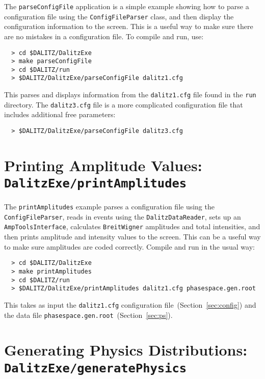 \documentclass[11pt]{article}
\begin{document}
The {\tt parseConfigFile} application is a simple example showing how to parse a configuration file using the {\tt ConfigFileParser} class, and then display the configuration information to the screen.  This is a useful way to make sure there are no mistakes in a configuration file.  To compile and run, use:
\begin{verbatim}
  > cd $DALITZ/DalitzExe
  > make parseConfigFile
  > cd $DALITZ/run
  > $DALITZ/DalitzExe/parseConfigFile dalitz1.cfg
\end{verbatim}
This parses and displays information from the {\tt dalitz1.cfg} file found in the {\tt run} directory.  The {\tt dalitz3.cfg} file is a more complicated configuration file that includes additional free parameters:
\begin{verbatim}
  > $DALITZ/DalitzExe/parseConfigFile dalitz3.cfg
\end{verbatim}

\section{Printing Amplitude Values: \\
{\tt DalitzExe/printAmplitudes}}

The {\tt printAmplitudes} example parses a configuration file using the {\tt ConfigFileParser}, reads in events using the {\tt DalitzDataReader}, sets up an {\tt AmpToolsInterface}, calculates {\tt BreitWigner} amplitudes and total intensities, and then prints amplitude and intensity values to the screen. This can be a useful way to make sure amplitudes are coded correctly.  Compile and run in the usual way:
\begin{verbatim}
  > cd $DALITZ/DalitzExe
  > make printAmplitudes
  > cd $DALITZ/run
  > $DALITZ/DalitzExe/printAmplitudes dalitz1.cfg phasespace.gen.root
\end{verbatim}
This takes as input the {\tt dalitz1.cfg} configuration file~(Section~\ref{sec:config}) and the data file {\tt phasespace.gen.root}~(Section~\ref{sec:ps}).

\section{Generating Physics Distributions: \\ 
{\tt DalitzExe/generatePhysics}}
\label{sec:physics}
\end{document}
